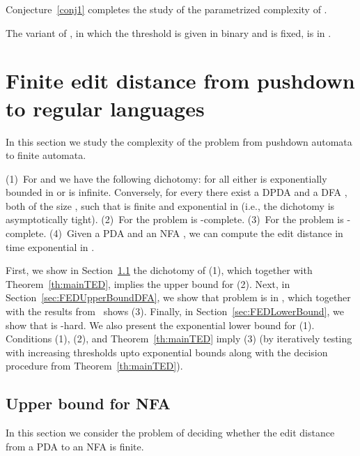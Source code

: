 \documentclass{CSML}
\begin{document}
Conjecture~\ref{conj1} completes the study of the parametrized complexity of .

\begin{conj}\label{conj1}
The variant of , in which the threshold is given in binary and 
 is fixed, is in .
\end{conj}

 

\section{Finite edit distance from pushdown to regular languages}
\makeatletter{}\label{s:FEDPDAtoRegular}
\newcommand{\nonTerm}{T}
\newcommand{\extNon}{B}
\newcommand{\reach}{\textsf{Reach}}


In this section we study the complexity of the  problem 
from pushdown automata to finite automata. 


\begin{thm}
(1)~For  and  we have the following dichotomy:
for all  either   is 
exponentially bounded in  or  is infinite.
Conversely, for every  there exist a DPDA  and a DFA , both of the size , such that 
 is finite and exponential in  (i.e.,
the dichotomy is asymptotically tight).
(2)~For  the  problem is -complete.
(3)~For  the  problem is -complete.
(4)~Given a PDA  and an NFA , we can compute the edit distance 
 in time exponential in .
\label{th:FEDmain}
\end{thm}

First, we show in Section~\ref{sec:FEDUpperBoundNFA} the dichotomy of (1), 
which together with Theorem~\ref{th:mainTED}, implies the  upper bound for (2).
Next, in Section~\ref{sec:FEDUpperBoundDFA}, we show that  problem is in , which together with the results from~\cite{boundedRiveros}
shows (3). 
Finally, in Section~\ref{sec:FEDLowerBound}, we show that  is 
-hard.
We also present the exponential lower bound for (1).
Conditions (1), (2), and Theorem~\ref{th:mainTED} imply (3)
(by iteratively testing with increasing thresholds upto exponential bounds 
along with the decision procedure from Theorem~\ref{th:mainTED}).

\subsection{Upper bound for NFA}
\label{sec:FEDUpperBoundNFA}

In this section we consider the problem of deciding whether the edit distance from a PDA to an NFA is finite. 
\end{document}
